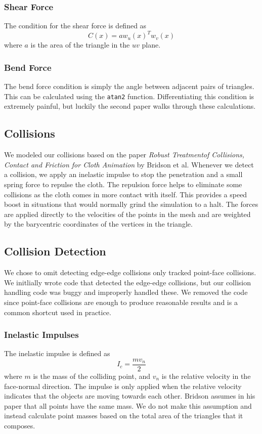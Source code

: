 \documentclass{article}
\def\code#1{\texttt{#1}}
\begin{document}
        \subsubsection{Shear Force}
        The condition for the shear force is defined as
        \[
            C(x) = aw_u(x)^Tw_v(x)
        \]
        where $a$ is the area of the triangle in the $uv$ plane.

        \subsubsection{Bend Force}
        The bend force condition is simply the angle between adjacent pairs of triangles. This can be calculated using the \code{atan2} function. Differentiating this condition is extremely painful, but luckily the second paper walks through these calculations.
    \subsection{Collisions}
    We modeled our collisions based on the paper \textit{Robust Treatmentof Collisions, Contact and Friction for Cloth Animation} by Bridson et al. Whenever we detect a collision, we apply an inelastic impulse to stop the penetration and a small spring force to repulse the cloth. The repulsion force helps to eliminate some collisions as the cloth comes in more contact with itself. This provides a speed boost in situations that would normally grind the simulation to a halt. The forces are applied directly to the velocities of the points in the mesh and are weighted by the barycentric coordinates of the vertices in the triangle.
        \subsection{Collision Detection}
        We chose to omit detecting edge-edge collisions only tracked point-face collisions. We initlially wrote code that detected the edge-edge collisions, but our collision handling code was buggy and improperly handled these. We removed the code since point-face collisions are enough to produce reasonable results and is a common shortcut used in practice.
        \subsubsection{Inelastic Impulses}
        The inelastic impulse is defined as
        \[
            I_c = \frac{mv_n}{2}
        \]
        where $m$ is the mass of the colliding point, and $v_n$ is the relative velocity in the face-normal direction. The impulse is only applied when the relative velocity indicates that the objects are moving towards each other. Bridson assumes in his paper that all points have the same mass. We do not make this assumption and instead calculate point masses based on the total area of the triangles that it composes.
\end{document}
